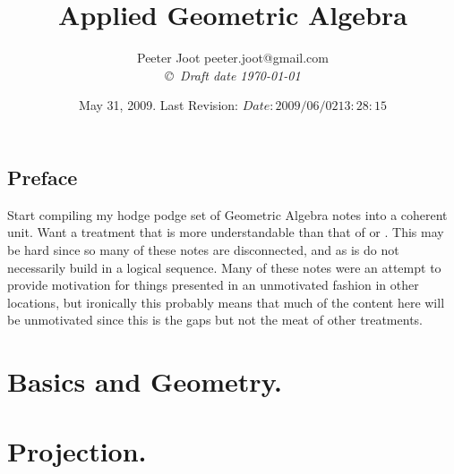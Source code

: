 \documentclass[12pt,leqno]{book}
\title{Applied Geometric Algebra}
\author{Peeter Joot  \quad peeter.joot@gmail.com \\
{\small\em \copyright \  Draft date \today }}
\date{ May 31, 2009.  Last Revision: $Date: 2009/06/02 13:28:15 $ }
\begin{document}
\maketitle
\tableofcontents
\listoffigures
\listoftables
\chapter*{Preface}\normalsize
\pagestyle{plain}

Start compiling my hodge podge set of Geometric Algebra notes into a coherent unit.  Want a treatment that is more
understandable than that of 
\cite{doran2003gap} or 
\cite{hestenes1999nfc}.
This may be hard since so many of these notes are disconnected, and as
is do not necessarily build in a logical sequence.  Many of these 
notes were an attempt to provide motivation for things presented in
an unmotivated fashion in other locations, but ironically this probably
means that much of the content here will be unmotivated since this 
is the gaps but not the meat of other treatments.

%

\pagestyle{headings}


\part{Basics and Geometry.}















\part{Projection.}






\end{document}
